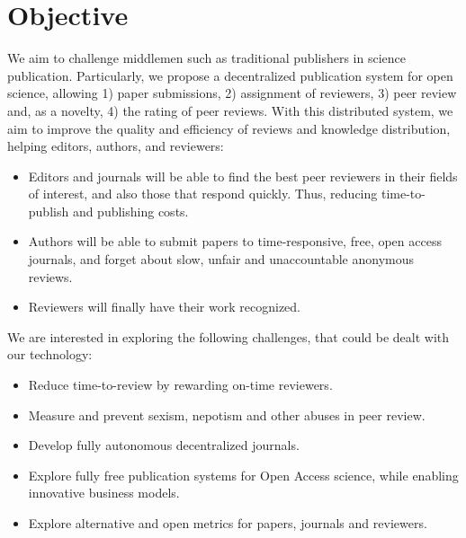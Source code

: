 \section{Objective}

We aim to challenge middlemen such as traditional publishers in science
publication. Particularly, we propose a decentralized publication system for
open science, allowing 1) paper submissions, 2) assignment of reviewers, 3) peer
review and, as a novelty, 4) the rating of peer reviews. With this distributed
system, we aim to improve the quality and efficiency of reviews and knowledge
distribution, helping editors, authors, and reviewers:
\begin{itemize}
\item Editors and journals will be able to find the best peer reviewers in their
  fields of interest, and also those that respond quickly. Thus, reducing
  time-to-publish and publishing costs.
\item Authors will be able to submit papers to time-responsive, free, open
  access journals, and forget about slow, unfair and unaccountable anonymous
  reviews.
\item Reviewers will finally have their work recognized.
\end{itemize}

We are interested in exploring the following challenges, that could be dealt
with our technology:
\begin{itemize}
\item Reduce time-to-review by rewarding on-time reviewers.
\item Measure and prevent sexism, nepotism and other abuses in peer review.
\item Develop fully autonomous decentralized journals.
\item Explore fully free publication systems for Open Access science, while
  enabling innovative business models.
\item Explore alternative and open metrics for papers, journals and reviewers.
\end{itemize}

